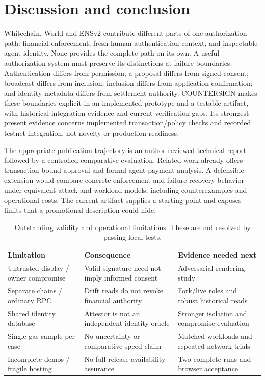 \documentclass[11pt]{article}
\begin{document}
\section{Discussion and conclusion}
Whitechain, World and ENSv2 contribute different parts of one authorization path: financial enforcement, fresh human authentication context, and inspectable agent identity. None provides the complete path on its own. A useful authorization system must preserve its distinctions at failure boundaries. Authentication differs from permission; a proposal differs from signed consent; broadcast differs from inclusion; inclusion differs from application confirmation; and identity metadata differs from settlement authority. COUNTERSIGN makes these boundaries explicit in an implemented prototype and a testable artifact, with historical integration evidence and current verification gaps. Its strongest present evidence concerns implemented transaction/policy checks and recorded testnet integration, not novelty or production readiness.

The appropriate publication trajectory is an author-reviewed technical report followed by a controlled comparative evaluation. Related work already offers transaction-bound approval and formal agent-payment analysis. A defensible extension would compare concrete enforcement and failure-recovery behavior under equivalent attack and workload models, including counterexamples and operational costs. The current artifact supplies a starting point and exposes limits that a promotional description could hide.

\begin{table}[htbp]\centering\small
\begin{tabular}{p{.28\linewidth}p{.32\linewidth}p{.30\linewidth}}\toprule
Limitation & Consequence & Evidence needed next\\\midrule
Untrusted display / owner compromise & Valid signature need not imply informed consent & Adversarial rendering study\\
Separate chains / ordinary RPC & Drift reads do not revoke financial authority & Fork/live roles and robust historical reads\\
Shared identity database & Attestor is not an independent identity oracle & Stronger isolation and compromise evaluation\\
Single gas sample per case & No uncertainty or comparative speed claim & Matched workloads and repeated network trials\\
Incomplete demos / fragile hosting & No full-release availability assurance & Two complete runs and browser acceptance\\\bottomrule
\end{tabular}
\caption{Outstanding validity and operational limitations. These are not resolved by passing local tests.}\label{tab:limits}
\end{table}
\end{document}
